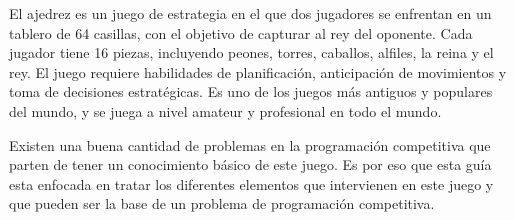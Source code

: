 El ajedrez es un juego de estrategia en el que dos jugadores se enfrentan en un tablero de 64 casillas, con el objetivo de capturar al rey del oponente. Cada jugador tiene 16 piezas, incluyendo peones, torres, caballos, alfiles, la reina y el rey. El juego requiere habilidades de planificación, anticipación de movimientos y toma de decisiones estratégicas. Es uno de los juegos más antiguos y populares del mundo, y se juega a nivel amateur y profesional en todo el mundo. 

Existen una buena cantidad de problemas en la programación competitiva que parten de tener un conocimiento básico de este juego. Es por eso que esta guía esta enfocada en tratar los diferentes elementos que intervienen en este juego y que pueden ser la base de un problema de programación competitiva.  
